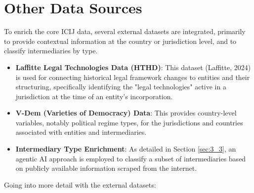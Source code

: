 \section{Other Data Sources}
\label{sec:3_2}
To enrich the core ICIJ data, several external datasets are integrated, primarily to provide contextual information at the country or jurisdiction level, and to classify intermediaries by type.

\begin{itemize}
    \item \textbf{Laffitte Legal Technologies Data (HTHD)}: This dataset (Laffitte, 2024) is used for connecting historical legal framework changes to entities and their structuring, specifically identifying the "legal technologies" active in a jurisdiction at the time of an entity's incorporation.
    \item \textbf{V-Dem (Varieties of Democracy) Data}: This provides country-level variables, notably political regime types, for the jurisdictions and countries associated with entities and intermediaries.
    \item \textbf{Intermediary Type Enrichment}: As detailed in Section \ref{sec:3_3}, an agentic AI approach is employed to classify a subset of intermediaries based on publicly available information scraped from the internet.
\end{itemize}

Going into more detail with the external datasets:

